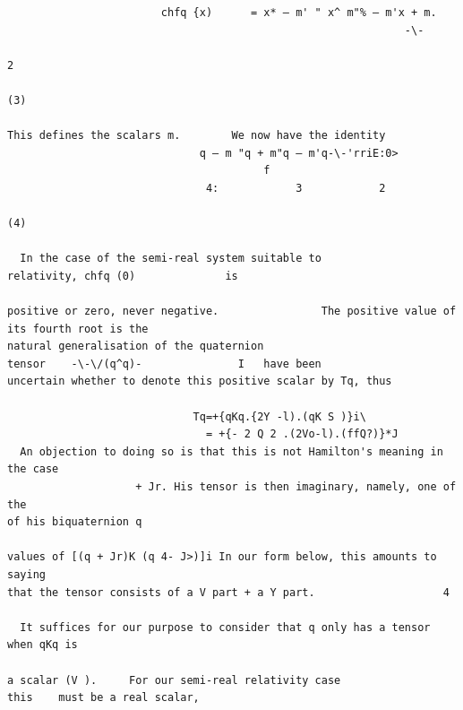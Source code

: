 \documentclass[10pt]{article}
\begin{document}
\begin{verbatim}
                        chfq {x)      = x* — m' " x^ m"% — m'x + m.
                                                              -\-
                                                                          2
                                                                                                                           (3)

This defines the scalars m.        We now have the identity
                              q — m "q + m"q — m'q-\-'rriE:0>
                                        f
                               4:            3            2
                                                                                                                           (4)

  In the case of the semi-real system suitable to                                         relativity, chfq (0)              is

positive or zero, never negative.                The positive value of its fourth root is the
natural generalisation of the quaternion                                tensor    -\-\/(q^q)-               I   have been
uncertain whether to denote this positive scalar by Tq, thus

                             Tq=+{qKq.{2Y -l).(qK S )}i\
                               = +{- 2 Q 2 .(2Vo-l).(ffQ?)}*J
  An objection to doing so is that this is not Hamilton's meaning in the case
                    + Jr. His tensor is then imaginary, namely, one of the
of his biquaternion q

values of [(q + Jr)K (q 4- J>)]i In our form below, this amounts to saying
that the tensor consists of a V part + a Y part.                    4

  It suffices for our purpose to consider that q only has a tensor when qKq is

a scalar (V ).     For our semi-real relativity case                             this    must be a real scalar,


\end{verbatim}
\clearpage
\end{document}
